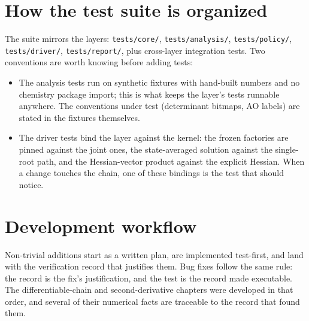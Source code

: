 \section{How the test suite is organized}

The suite mirrors the layers: \texttt{tests/core/},
\texttt{tests/analysis/}, \texttt{tests/policy/},
\texttt{tests/driver/}, \texttt{tests/report/}, plus cross-layer
integration tests.  Two conventions are worth knowing before adding
tests:

\begin{itemize}
  \item The analysis tests run on synthetic fixtures with hand-built
    numbers and no chemistry package import; this is what keeps the
    layer's tests runnable anywhere.  The conventions under test
    (determinant bitmaps, AO labels) are stated in the fixtures
    themselves.
  \item The driver tests bind the layer against the kernel: the
    frozen factories are pinned against the joint ones, the
    state-averaged solution against the single-root path, and the
    Hessian-vector product against the explicit Hessian.  When a
    change touches the chain, one of these bindings is the test that
    should notice.
\end{itemize}

\section{Development workflow}

Non-trivial additions start as a written plan, are implemented
test-first, and land with the verification record that justifies them.
Bug fixes follow the same rule: the record is the fix's justification,
and the test is the record made executable.  The differentiable-chain
and second-derivative chapters were developed in that order, and several
of their numerical facts are traceable to the record that found them.
